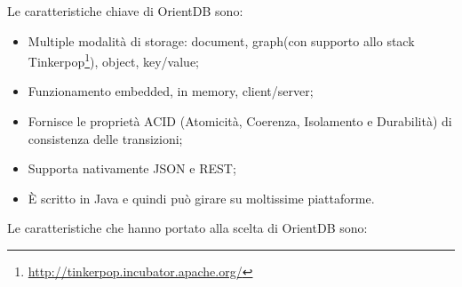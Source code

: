 Le caratteristiche chiave di OrientDB sono:
\begin{itemize}
	\item Multiple modalità di storage: document, graph(con supporto allo stack Tinkerpop\footnote{\url{http://tinkerpop.incubator.apache.org/}}), object, key/value;
	\item Funzionamento embedded, in memory, client/server;
	\item Fornisce le proprietà ACID (Atomicità, Coerenza, Isolamento e Durabilità) di consistenza delle transizioni;
	\item Supporta nativamente \gls{JSON} e \gls{REST};
	\item È scritto in Java e quindi può girare su moltissime piattaforme.
\end{itemize}
Le caratteristiche che hanno portato alla scelta di OrientDB sono:
